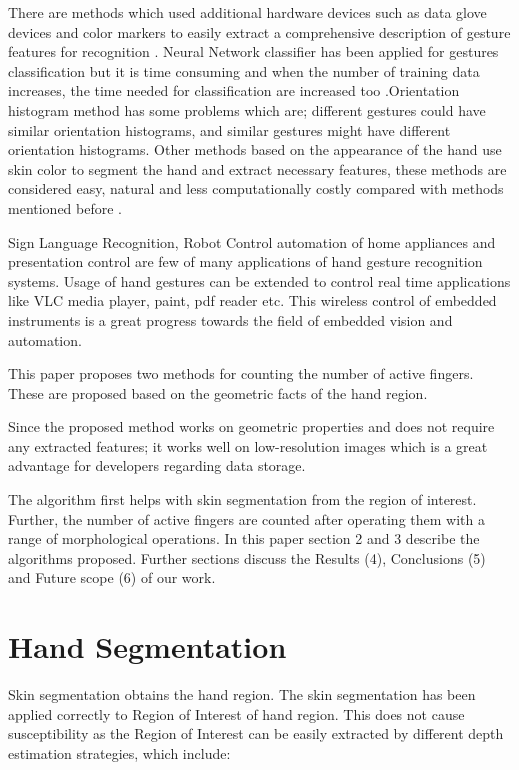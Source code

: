 \documentclass[conference]{IEEEtran}
\begin{document}
 There are methods which used additional hardware devices such as data glove devices and color markers to easily extract a comprehensive description of gesture features for recognition \cite{1199054} . Neural Network classifier has been applied for gestures classification \cite{Murakami:1991:GRU:108844.108900} but it is time consuming and when the number of training data increases, the time needed for classification are increased too .Orientation histogram method \cite{freeman1995orientation} has some problems which are; different gestures could have similar orientation histograms, and similar gestures might have different orientation histograms. Other methods based on the appearance of the hand use skin color to segment the hand and extract necessary features, these methods are considered easy, natural and less computationally costly compared with methods mentioned before \cite{1199054} .

Sign Language Recognition, Robot Control automation of home appliances and presentation control are few of many applications of hand gesture recognition systems. Usage of hand gestures can be extended to control real time applications like VLC media player, paint, pdf reader etc. This wireless control of embedded instruments is a great progress towards the field of embedded vision and automation.

This paper proposes two methods for counting the number of active fingers. These are proposed based on the geometric facts of the hand region. 

Since the proposed method works on geometric properties and does not require any extracted features; it works well on low-resolution images which is a great advantage for developers regarding data storage.

The algorithm first helps with skin segmentation from the region of interest. Further, the number of active fingers are counted after operating them with a range of morphological operations.
In this paper section 2 and 3 describe the algorithms proposed. Further sections discuss the Results (4), Conclusions (5) and Future scope (6) of our work. 




\section{Hand Segmentation}

Skin segmentation obtains the hand region. The skin segmentation has been applied correctly to Region of Interest of hand region. This does not cause susceptibility as the Region of Interest can be easily extracted by different depth estimation strategies, which include:
\end{document}
